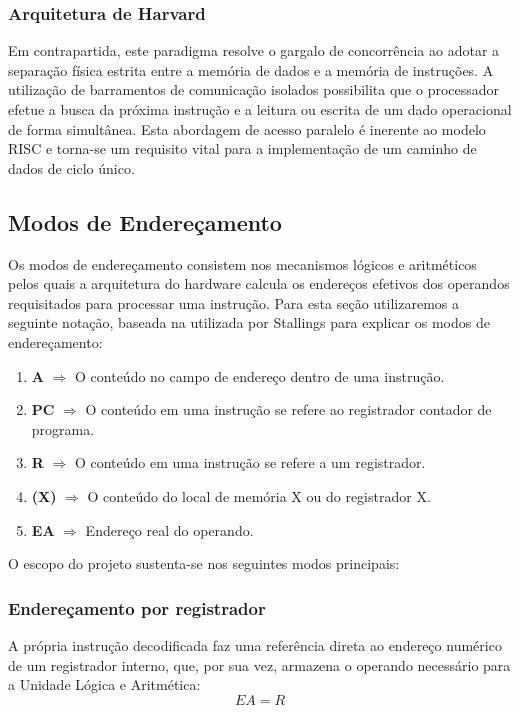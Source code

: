 \documentclass[
	12pt,				%
	oneside,
	a4paper,			%
	english,			%
	french,				%
	spanish,			%
	brazil,				%
	]{abntex2}
\begin{document}
\subsubsection{Arquitetura de Harvard}
Em contrapartida, este paradigma resolve o gargalo de concorrência ao adotar a separação física estrita entre a memória de dados e a memória de instruções. A utilização de barramentos de comunicação isolados possibilita que o processador efetue a busca da próxima instrução e a leitura ou escrita de um dado operacional de forma simultânea. Esta abordagem de acesso paralelo é inerente ao modelo RISC e torna-se um requisito vital para a implementação de um caminho de dados de ciclo único.



\subsection{Modos de Endereçamento}
Os modos de endereçamento consistem nos mecanismos lógicos e aritméticos pelos quais a arquitetura do hardware calcula os endereços efetivos dos operandos requisitados para processar uma instrução.
Para esta seção utilizaremos a seguinte notação, baseada na utilizada por Stallings \cite{stallings2017} para explicar os modos de endereçamento:
\begin{enumerate}
    \item \textbf{A} $\Rightarrow$ O conteúdo no campo de endereço dentro de uma instrução.
    \item \textbf{PC} $\Rightarrow$  O conteúdo em uma instrução se refere ao registrador contador de programa.
    \item \textbf{R} $\Rightarrow$ O conteúdo em uma instrução se refere a um registrador.
    \item \textbf{(X)} $\Rightarrow$ O conteúdo do local de memória X ou do registrador X.
    \item \textbf{EA} $\Rightarrow$ Endereço real do operando.
\end{enumerate}
O escopo do projeto sustenta-se nos seguintes modos principais:

\subsubsection{Endereçamento por registrador}
A própria instrução decodificada faz uma referência direta ao endereço numérico de um registrador interno, que, por sua vez, armazena o operando necessário para a Unidade Lógica e Aritmética:
$$EA=R$$
\end{document}
